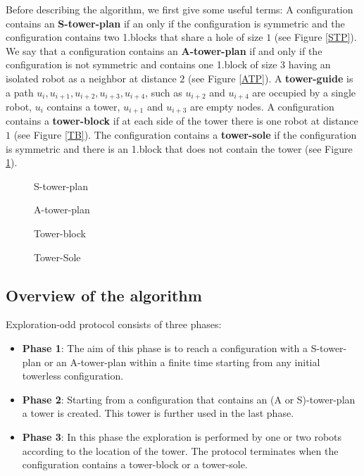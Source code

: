 \documentclass[12pt]{llncs}
\begin{document}
Before describing the algorithm, we first give some useful terms:
A configuration contains an {\bf S-tower-plan} if an only if the configuration is symmetric and the configuration contains two 1.blocks that share a hole of size $1$ (see Figure \ref{STP}). We say that a configuration contains an {\bf A-tower-plan} if and only if the configuration is not symmetric and contains one 1.block of size $3$ having an isolated robot as a neighbor at distance $2$ (see Figure \ref{ATP}). A {\bf tower-guide} is a path $u_{i},u_{i+1},u_{i+2},u_{i+3},u_{i+4}$, such as $u_{i+2}$ and $u_{i+4}$ are occupied by a single robot, $u_{i}$ contains a tower, $u_{i+1}$ and $u_{i+3}$ are empty nodes. A configuration contains a {\bf tower-block} if at each side of the tower there is one robot at distance $1$ (see Figure \ref{TB}). The configuration contains a {\bf tower-sole} if the configuration is symmetric and there is an 1.block that does not contain the tower (see Figure \ref{TS}).  

\begin{figure}
 \begin{minipage}[b]{.46\linewidth}
  \centering{}
  \caption{S-tower-plan\label{STP}}
 \end{minipage} \hfill
 \begin{minipage}[b]{.46\linewidth}
  \centering{}
  \caption{A-tower-plan  \label{ATP}}
 \end{minipage}
\begin{minipage}[b]{.46\linewidth}
  \centering{}
  \caption{Tower-block\label{TB}}
 \end{minipage} \hfill
 \begin{minipage}[b]{.46\linewidth}
  \centering{}
  \caption{Tower-Sole  \label{TS}}
 \end{minipage}
\end{figure}  

\subsection{\textbf{Overview of the algorithm}}
Exploration-odd protocol consists of three phases:
\begin{itemize}
\item{\textbf{Phase 1}}: The aim of this phase is to reach a configuration with a S-tower-plan or an A-tower-plan within a finite time starting from any initial towerless configuration.\\

\item{\textbf{Phase 2}}: Starting from a configuration that contains an (A or S)-tower-plan a tower is created. This tower is further used in the last phase.\\

\item{\textbf{Phase 3}}: In this phase the exploration is performed by one or two robots according to the location of the tower. The protocol terminates when the configuration contains a tower-block or a tower-sole. \\

\end{itemize}
\end{document}
